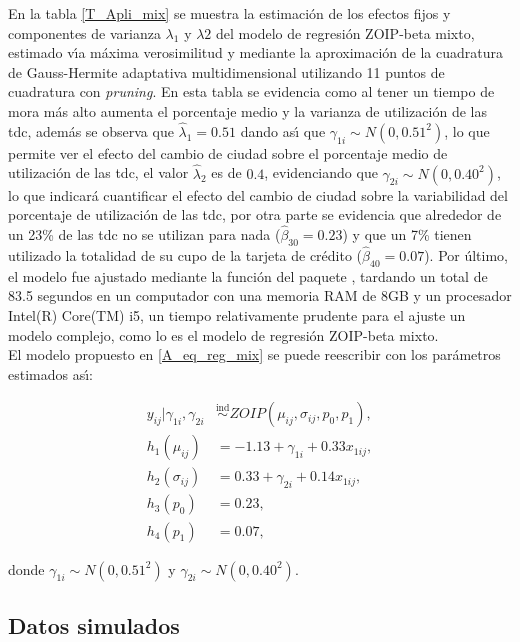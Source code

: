 En la tabla \ref{T_Apli_mix} se muestra la estimaci\'{o}n de los efectos fijos y componentes de varianza $\lambda_1$ y $\lambda2$ del modelo de regresi\'{o}n ZOIP-beta mixto, estimado v\'{\i}a m\'{a}xima verosimilitud y mediante la aproximaci\'{o}n de la cuadratura de Gauss-Hermite adaptativa multidimensional utilizando 11 puntos de cuadratura con \textit{pruning}. En esta tabla se evidencia como al tener un tiempo de mora m\'{a}s alto aumenta el porcentaje medio y la varianza de utilizaci\'{o}n de las tdc, adem\'{a}s se observa que $\hat{\lambda}_1=0.51$ dando as\'{\i} que $\gamma_{1i} \sim N(0, 0.51^2)$, lo que permite ver el efecto del cambio de ciudad sobre el porcentaje medio de utilizaci\'{o}n de las tdc, el valor $\hat{\lambda}_2$ es de $0.4$, evidenciando que $\gamma_{2i} \sim N(0, 0.40^2)$, lo que indicar\'{a} cuantificar el efecto del cambio de ciudad sobre la variabilidad del porcentaje de utilizaci\'{o}n de las tdc, por otra parte se evidencia que alrededor de un 23\% de las tdc no se utilizan para nada ($\hat{\beta}_{30}=0.23$) y que un 7\% tienen utilizado la totalidad de su cupo de la tarjeta de cr\'{e}dito ($\hat{\beta}_{40}=0.07$). Por \'{u}ltimo, el modelo fue ajustado mediante la funci\'{o}n  del paquete , tardando un total de 83.5 segundos en un computador con una memoria RAM de 8GB y un procesador Intel(R) Core(TM) i5, un tiempo relativamente prudente para el ajuste un modelo complejo, como lo es el modelo de regresi\'{o}n ZOIP-beta mixto.\\

El modelo propuesto en \eqref{A_eq_reg_mix} se puede reescribir con los par\'{a}metros estimados as\'{\i}:

\begin{equation}
\begin{split}
y_{ij}| \gamma_{1i},\gamma_{2i} & \overset{\text{ind}}{\sim} ZOIP(\mu_{ij},\sigma_{ij},p_0, p_1),\\
h_1(\mu_{ij})&=-1.13+\gamma_{1i}+0.33 x_{1ij},\\
h_2(\sigma_{ij})&=0.33+\gamma_{2i}+0.14 x_{1ij},\\
h_3(p_{0})&=0.23,\\
h_4(p_{1})&=0.07,
\end{split}
\label{A_eq_reg_mix2}
\end{equation}

donde $\gamma_{1i} \sim N(0, 0.51^2)$ y $\gamma_{2i} \sim N(0, 0.40^2)$.

\subsection{Datos simulados}

